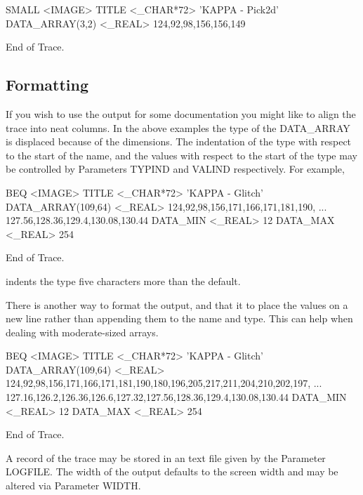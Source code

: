 \documentclass[11pt,nolof]{starlink}
\begin{document}
\small
\begin{terminalv}

SMALL  <IMAGE>
  TITLE          <_CHAR*72>      'KAPPA - Pick2d'
  DATA_ARRAY(3,2)  <_REAL>       124,92,98,156,156,149

End of Trace.
\end{terminalv}
\normalsize
\subsection{Formatting}

If you wish to use the output for some documentation you might like
to align the trace into neat columns.  In the above examples the
type of the DATA\_ARRAY is displaced because of the dimensions.  The
indentation of the type with respect to the start of the name, and the
values with respect to the start of the type may be controlled by
Parameters TYPIND and VALIND respectively.  For example,

\small
\begin{terminalv}

BEQ  <IMAGE>
  TITLE               <_CHAR*72>      'KAPPA - Glitch'
  DATA_ARRAY(109,64)  <_REAL>         124,92,98,156,171,166,171,181,190,
                                      ... 127.56,128.36,129.4,130.08,130.44
  DATA_MIN            <_REAL>         12
  DATA_MAX            <_REAL>         254

End of Trace.
\end{terminalv}
\normalsize
indents the type five characters more than the default.

There is another way to format the output, and that it to place the
values on a new line rather than appending them to the name and type.
This can help when dealing with moderate-sized arrays.

\small
\begin{terminalv}

BEQ  <IMAGE>
  TITLE          <_CHAR*72>
   'KAPPA - Glitch'
  DATA_ARRAY(109,64)  <_REAL>
   124,92,98,156,171,166,171,181,190,180,196,205,217,211,204,210,202,197,
   ... 127.16,126.2,126.36,126.6,127.32,127.56,128.36,129.4,130.08,130.44
  DATA_MIN       <_REAL>
   12
  DATA_MAX       <_REAL>
   254

End of Trace.
\end{terminalv}
\normalsize
A record of the trace may be stored in an text file given by the
Parameter LOGFILE.  The width of the output defaults to the screen
width and may be altered via Parameter WIDTH.
\end{document}
